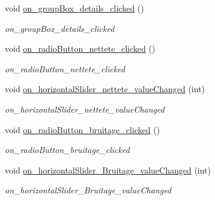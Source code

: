 \begin{DoxyCompactItemize}
\mbox{\label{classAppMainWindow_a1a44bb8a30a009b31a310afbd8b6f5d5}} 
void \hyperlink{classAppMainWindow_a1a44bb8a30a009b31a310afbd8b6f5d5}{on\+\_\+group\+Box\+\_\+details\+\_\+clicked} ()
\begin{DoxyCompactList}\small\item\em on\+\_\+group\+Box\+\_\+details\+\_\+clicked \end{DoxyCompactList}\item 
\mbox{\label{classAppMainWindow_a415ee61f1bad859435161a153ffb5ddd}} 
void \hyperlink{classAppMainWindow_a415ee61f1bad859435161a153ffb5ddd}{on\+\_\+radio\+Button\+\_\+nettete\+\_\+clicked} ()
\begin{DoxyCompactList}\small\item\em on\+\_\+radio\+Button\+\_\+nettete\+\_\+clicked \end{DoxyCompactList}\item 
\mbox{\label{classAppMainWindow_abbf6f7da99ff178646ddae8b6210695a}} 
void \hyperlink{classAppMainWindow_abbf6f7da99ff178646ddae8b6210695a}{on\+\_\+horizontal\+Slider\+\_\+nettete\+\_\+value\+Changed} (int)
\begin{DoxyCompactList}\small\item\em on\+\_\+horizontal\+Slider\+\_\+nettete\+\_\+value\+Changed \end{DoxyCompactList}\item 
\mbox{\label{classAppMainWindow_aaba7dfcc45216efadf523e0e303d1751}} 
void \hyperlink{classAppMainWindow_aaba7dfcc45216efadf523e0e303d1751}{on\+\_\+radio\+Button\+\_\+bruitage\+\_\+clicked} ()
\begin{DoxyCompactList}\small\item\em on\+\_\+radio\+Button\+\_\+bruitage\+\_\+clicked \end{DoxyCompactList}\item 
\mbox{\label{classAppMainWindow_a88a4155c1540115b46a39691e520362b}} 
void \hyperlink{classAppMainWindow_a88a4155c1540115b46a39691e520362b}{on\+\_\+horizontal\+Slider\+\_\+\+Bruitage\+\_\+value\+Changed} (int)
\begin{DoxyCompactList}\small\item\em on\+\_\+horizontal\+Slider\+\_\+\+Bruitage\+\_\+value\+Changed \end{DoxyCompactList}\item 

\end{DoxyCompactItemize}
